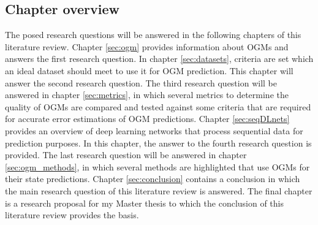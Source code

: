 \subsection{Chapter overview}
The posed research questions will be answered in the following chapters of this literature review. Chapter \ref{sec:ogm} provides information about \glspl{OGM} and answers the first research question. In chapter \ref{sec:datasets}, criteria are set which an ideal dataset should meet to use it for \gls{OGM} prediction. This chapter will answer the second research question. The third research question will be answered in chapter \ref{sec:metrics}, in which several metrics to determine the quality of \glspl{OGM} are compared and tested against some criteria that are required for accurate error estimations of \gls{OGM} predictions. Chapter \ref{sec:seqDLnets} provides an overview of deep learning networks that process sequential data for prediction purposes. In this chapter, the answer to the fourth research question is provided. The last research question will be answered in chapter \ref{sec:ogm_methods}, in which several methods are highlighted that use \glspl{OGM} for their state predictions. Chapter \ref{sec:conclusion} contains a conclusion in which the main research question of this literature review is answered. The final chapter is a research proposal for my Master thesis to which the conclusion of this literature review provides the basis.









